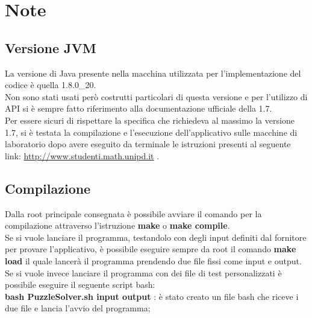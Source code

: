 % 
%
% 
%

\section{Note}
	\subsection{Versione JVM}
La versione di Java presente nella macchina utilizzata per l'implementazione del codice è quella 1.8.0\_20. \\
Non sono stati usati però costrutti particolari di questa versione e per l'utilizzo di API si è sempre fatto riferimento alla documentazione ufficiale della 1.7. \\
Per essere sicuri di rispettare la specifica che richiedeva al massimo la versione 1.7, si è testata la compilazione e l'esecuzione dell'applicativo sulle macchine di laboratorio dopo avere eseguito da terminale le istruzioni presenti al seguente link: \href{http://www.studenti.math.unipd.it/index.php?id=corsi#c620}{http://www.studenti.math.unipd.it} .

	\subsection{Compilazione}
Dalla root principale consegnata è possibile avviare il comando per la compilazione attraverso l'istruzione \textbf{make} o \textbf{make compile}. \\
Se si vuole lanciare il programma, testandolo con degli input definiti dal fornitore per provare l'applicativo, è possibile eseguire sempre da root il comando \textbf{make load} il quale lancerà il programma prendendo due file fissi come input e output. \\
Se si vuole invece lanciare il programma con dei file di test personalizzati è possibile eseguire il seguente script bash: \\
\textbf{bash PuzzleSolver.sh input output} : è stato creato un file bash che riceve i due file e lancia l'avvio del programma;

